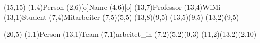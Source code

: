 \documentclass[11pt,a4paper]{article}
\begin{document}
\setlength{\unitlength}{.6cm}
\begin{schema}(15,15)
  \entity(1,4){Person}
  \attr(2,6)[o]{Name}
  \attr(4,6)[o]{}
  \relation(13,7){Professor}
  \relation(13,4){WiMi}
  \relation(13,1){Student}
  \cluster(7,4){Mitarbeiter}
  \connection(7,5)(5,5){}
  \connection(13,8)(9,5){}
  \connection(13,5)(9,5){}
  \connection(13,2)(9,5){}
\end{schema}


\begin{schema}(20,5)
  \entity(1,1){Person}
  \entity(13,1){Team}
  \relation(7,1){arbeitet\_in}
  \connection(7,2)(5,2){(0,3)}
  \connection(11,2)(13,2){(2,10)}
\end{schema}
\end{document}
